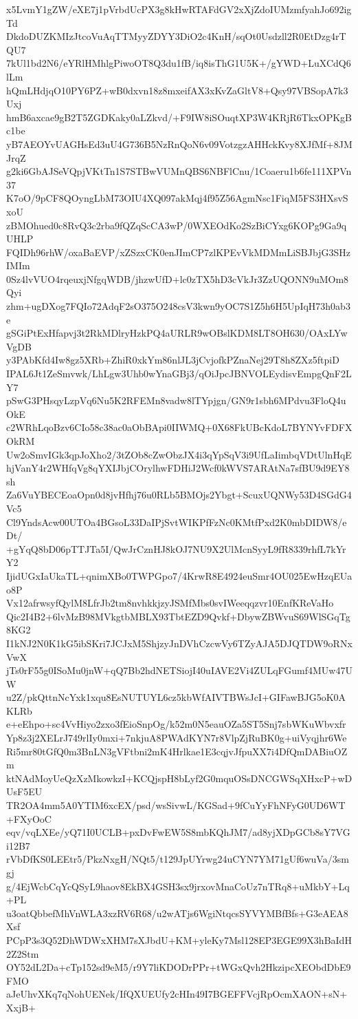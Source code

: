 x5LvmY1gZW/eXE7j1pVrbdUcPX3g8kHwRTAFdGV2xXjZdoIUMzmfyahJo692igTd
DkdoDUZKMIzJtcoVuAqTTMyyZDYY3DiO2c4KnH/sqOt0Usdzll2R0EtDzg4rTQU7
7kUl1bd2N6/eYRlHMhlgPiwoOT8Q3du1fB/iq8isThG1U5K+/gYWD+LuXCdQ6lLm
hQmLHdjqO10PY6PZ+wB0dxvn18z8mxeifAX3xKvZaGltV8+Qsy97VBSopA7k3Uxj
hmB6axcae9gB2T5ZGDKaky0aLZkvd/+F9IW8iSOuqtXP3W4KRjR6TkxOPKgBc1be
yB7AEOYvUAGHsEd3uU4G736B5NzRnQoN6v09VotzgzAHHckKvy8XJfMf+8JMJrqZ
g2ki6GbAJSeVQpjVKtTn1S7STBwVUMnQBS6NBFlCnu/1Coaeru1b6fe111XPVn37
K7oO/9pCF8QOyngLbM73OIU4XQ097akMqj4f95Z56AgmNsc1FiqM5FS3HXsvSxoU
zBMOhued0c8RvQ3c2rba9fQZqScCA3wP/0WXEOdKo2SzBiCYxg6KOPg9Ga9qUHLP
FQIDh96rhW/oxaBaEVP/xZSzxCK0enJImCP7zlKPEvVkMDMmLiSBJbjG3SHzIMIm
0Sz4lvVUO4rqeuxjNfgqWDB/jhzwUfD+lc0zTX5hD3cVkJr3ZzUQONN9uMOm8Qyi
zhm+ugDXog7FQIo72AdqF2sO375O248csV3kwn9yOC7S1Z5h6H5UpIqH73h0ab3e
gSGiPtExHfapvj3t2RkMDlryHzkPQ4aURLR9wOBslKDM8LT8OH630/OAxLYwVgDB
y3PAbKfd4Iw8gz5XRb+ZhiR0xkYm86nlJL3jCvjofkPZnaNej29T8h8ZXz5ftpiD
IPAL6Jt1ZeSmvwk/LhLgw3Uhb0wYnaGBj3/qOiJpcJBNVOLEydisvEmpgQnF2LY7
pSwG3PHsqyLzpVq6Nu5K2RFEMn8vadw8lTYpjgn/GN9r1sbh6MPdvu3FloQ4uOkE
c2WRhLqoBzv6CIo58c38ac0aObBApi0IIWMQ+0X68FkUBcKdoL7BYNYvFDFXOkRM
Uw2oSmvIGk3qpJoXho2/3tZOb8cZwObzJX4i3qYpSqV3i9UfLaIimbqVDtUlnHqE
hjVanY4r2WHfqVg8qYXIJbjCOrylhwFDHiJ2Wcf0kWVS7ARAtNa7sfBU9d9EY8sh
Za6VuYBECEoaOpn0d8jvHfhj76u0RLb5BMOjs2Ybgt+ScuxUQNWy53D4SGdG4Vc5
Cl9YndsAcw00UTOa4BGsoL33DaIPjSvtWIKPfFzNc0KMtfPxd2K0mbDIDW8/eDt/
+gYqQ8bD06pTTJTa5I/QwJrCznHJ8kOJ7NU9X2UlMcnSyyL9fR8339rhfL7kYrY2
IjidUGxIaUkaTL+qnimXBo0TWPGpo7/4KrwR8E4924euSmr4OU025EwHzqEUao8P
Vx12afrwsyfQylM8LfrJb2tm8nvhkkjzyJSMfMbs0svIWeeqqzvr10EnfKReVaHo
Qic2I4B2+6lvMzB98MVkgtbMBLX93TbtEZD9Qvkf+DbywZBWvuS69WlSGqTg8KG2
I1kNJ2N0K1kG5ibSKri7JCJxM5ShjzyJnDVhCzcwVy6TZyAJA5DJQTDW9oRNxVwX
jTs0rF55g0ISoMu0jnW+qQ7Bb2hdNETSiojI40uIAVE2Vi4ZULqFGumf4MUw47UW
u2Z/pkQttnNcYxk1xqu8EsNUTUYL6cz5kbWfAIVTBWsJcI+GIFawBJG5oK0AKLRb
e+eEhpo+sc4VvHiyo2zxo3fEioSnpOg/k52m0N5eauOZa5ST5Snj7sbWKuWbvxfr
Yp8z3j2XELrJ749rlIy0mxi+7nkjuA8PWAdKYN7r8VlpZjRuBK0g+uiVyqjhr6We
Ri5mr80tGfQ0m3BnLN3gVFtbni2mK4Hrlkae1E3cqjvJfpuXX7i4DfQmDABiuOZm
ktNAdMoyUeQzXzMkowkzI+KCQjspH8bLyf2G0mquOSsDNCGWSqXHxcP+wDUsF5EU
TR2OA4mm5A0YTIM6xcEX/psd/wsSivwL/KGSad+9fCuYyFhNFyG0UD6WT+FXyOoC
eqv/vqLXEe/yQ71I0UCLB+pxDvFwEW5S8mbKQhJM7/ad8yjXDpGCb8sY7VGi12B7
rVbDfKS0LEEtr5/PkzNxgH/NQt5/t129JpUYrwg24uCYN7YM71gUf6wuVa/3smgj
g/4EjWcbCqYcQSyL9haov8EkBX4GSH3sx9jrxovMnaCoUz7nTRq8+uMkbY+Lq+PL
u3oatQbbefMhVnWLA3xzRV6R68/u2wATjs6WgiNtqcsSYVYMBfBfs+G3eAEA8Xsf
PCpP3s3Q52DhWDWxXHM7sXJbdU+KM+yleKy7Msl128EP3EGE99X3hBaIdH2Z2Stm
OY52dL2Da+cTp152sd9eM5/r9Y7liKDODrPPr+tWGxQvh2HkzipcXEObdDbE9FMO
aJeUhvXKq7qNohUENek/IfQXUEUfy2cHIn49I7BGEFFVcjRpOcmXAON+sN+XxjB+
